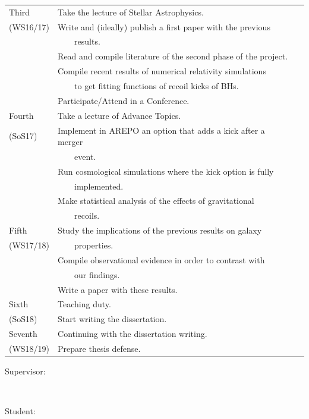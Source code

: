\documentclass[a4,useAMS,usenatbib,usegraphicx,12pt]{article}
\begin{document}
\begin{table}[!htbp]
\begin{flushleft}
\begin{center}
\begin{footnotesize}
\begin{tabular}{l  l  l}
	\hline
	Third
	& \tabitem Take the lecture of Stellar Astrophysics.  			& \\
	(WS16/17)
	& \tabitem Write and (ideally) publish a first paper with the previous	& \\
	& \ \ \ \ results.    							& \\
	& \tabitem Read and compile literature of the second phase of the project.& \\
	& \tabitem Compile recent results of numerical relativity simulations	& \\
	& \ \ \ \ to get fitting functions of recoil kicks of BHs.    		& \\
	& \tabitem Participate/Attend in a Conference.	  			& \\
	\hline
	
	Fourth
	& \tabitem Take a lecture of Advance Topics.	 			& \\
	(SoS17)
	& \tabitem Implement in AREPO an option that adds a kick after a merger	& \\
	& \ \ \ \ event.							& \\
	& \tabitem Run cosmological simulations where the kick option is fully	& \\
	& \ \ \ \ implemented.							& \\
	& \tabitem Make statistical analysis of the effects of gravitational	& \\
	& \ \ \ \ recoils.							& \\
	
	\hline
	Fifth
	& \tabitem Study the implications of the previous results on galaxy	& \\
	(WS17/18)
	& \ \ \ \ properties.							& \\
	& \tabitem Compile observational evidence in order to contrast with	& \\
	& \ \ \ \ our findings.							& \\
	& \tabitem Write a paper with these results.				& \\

	\hline
	Sixth
	& \tabitem Teaching duty.						& \\
	(SoS18)
	& \tabitem Start writing the dissertation.				& \\
	
	\hline
	Seventh
	& \tabitem Continuing with the dissertation writing.			& \\
	(WS18/19)
	& \tabitem Prepare thesis defense.					& \\
	\hline\hline
	
  \end{tabular}  
\end{footnotesize}
\end{center}
\end{flushleft}
\end{table}


Supervisor:

\

Student:
\end{document}
